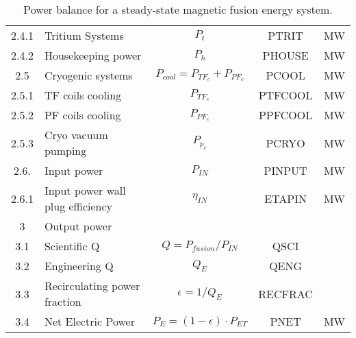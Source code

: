 \begin{table}[ht!]
\begin{tabular}{|c|p{5cm}|c|c|c|}
2.4.1	&	Tritium Systems	&	$P_{{t}}$	&	PTRIT	&	MW \\
2.4.2	&	Housekeeping power	&	$P_{{h}}$	&	PHOUSE	&	MW \\
2.5	&	Cryogenic systems	&	$P_{{cool}} = P_{{TF}_c} + P_{{PF}_c}$	&	PCOOL	&	MW \\
2.5.1	&	TF coils cooling	&	$P_{{TF}_c}$	&	PTFCOOL	&	MW \\
2.5.2	&	PF coils cooling	&	$P_{{PF}_c}$	&	PPFCOOL	&	MW \\
2.5.3	&	Cryo vacuum pumping	&	$P_{{p}_c}$	&	PCRYO	&	MW \\
2.6.	& Input power 	& $P_{IN}$	&	PINPUT	&	MW \\
2.6.1	& Input power wall plug efficiency  &	$\eta_{IN}$ & ETAPIN	&	MW \\
\hline								
3	&	Output power	&		&		&	\\
\hline
3.1	&	Scientific Q	&	$Q = P_{{fusion}}/P_{{IN}}$	&	QSCI	&	\\
3.2	&	Engineering Q	&	$Q_{{E}}$	&	QENG	&	\\
3.3	&	Recirculating power fraction	&	$\epsilon = 1/Q_{{E}}$	&	RECFRAC	&	\\
3.4	&	Net Electric Power	&	$P_{{E}} = (1 - \epsilon) \cdot P_{{ET}}$	&	PNET	&	MW \\
\hline								
\end{tabular}	
\caption{Power balance for a steady-state magnetic fusion energy system.}
\label{tab:powerbalance}
\end{table}





